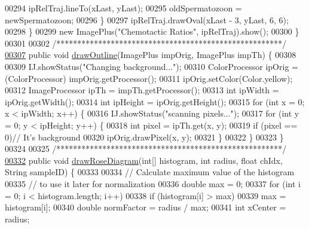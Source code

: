\begin{DoxyCode}
00294         ipRelTraj.lineTo(xLast, yLast);
00295         oldSpermatozoon = newSpermatozoon;
00296       \}
00297       ipRelTraj.drawOval(xLast - 3, yLast, 6, 6);
00298     \}
00299     \textcolor{keyword}{new} ImagePlus(\textcolor{stringliteral}{"Chemotactic Ratios"}, ipRelTraj).show();
00300   \}
00301 
00302   \textcolor{comment}{/******************************************************/}
\hypertarget{_paint_8java_source_l00307}{}\hyperlink{classfunctions_1_1_paint_a79f677db3c0f2261152a784802dab3c2}{00307}   \textcolor{keyword}{public} \textcolor{keywordtype}{void} \hyperlink{classfunctions_1_1_paint_a79f677db3c0f2261152a784802dab3c2}{drawOutline}(ImagePlus impOrig, ImagePlus impTh) \{
00308 
00309     IJ.showStatus(\textcolor{stringliteral}{"Changing background..."});
00310     ColorProcessor ipOrig = (ColorProcessor) impOrig.getProcessor();
00311     ipOrig.setColor(Color.yellow);
00312     ImageProcessor ipTh = impTh.getProcessor();
00313     \textcolor{keywordtype}{int} ipWidth = ipOrig.getWidth();
00314     \textcolor{keywordtype}{int} ipHeight = ipOrig.getHeight();
00315     \textcolor{keywordflow}{for} (\textcolor{keywordtype}{int} x = 0; x < ipWidth; x++) \{
00316       IJ.showStatus(\textcolor{stringliteral}{"scanning pixels..."});
00317       \textcolor{keywordflow}{for} (\textcolor{keywordtype}{int} y = 0; y < ipHeight; y++) \{
00318         \textcolor{keywordtype}{int} pixel = ipTh.get(x, y);
00319         \textcolor{keywordflow}{if} (pixel == 0)\textcolor{comment}{// It's background}
00320           ipOrig.drawPixel(x, y);
00321       \}
00322     \}
00323   \}
00324 
00325   \textcolor{comment}{/******************************************************/}
\hypertarget{_paint_8java_source_l00332}{}\hyperlink{classfunctions_1_1_paint_ae6e7f899e277190943b0c57232976e97}{00332}   \textcolor{keyword}{public} \textcolor{keywordtype}{void} \hyperlink{classfunctions_1_1_paint_ae6e7f899e277190943b0c57232976e97}{drawRoseDiagram}(\textcolor{keywordtype}{int}[] histogram, \textcolor{keywordtype}{int} radius, \textcolor{keywordtype}{float} chIdx, String sampleID) \{
00333 
00334     \textcolor{comment}{// Calculate maximum value of the histogram}
00335     \textcolor{comment}{// to use it later for normalization}
00336     \textcolor{keywordtype}{double} max = 0;
00337     \textcolor{keywordflow}{for} (\textcolor{keywordtype}{int} i = 0; i < histogram.length; i++)
00338       \textcolor{keywordflow}{if} (histogram[i] > max)
00339         max = histogram[i];
00340     \textcolor{keywordtype}{double} normFactor = radius / max;
00341     \textcolor{keywordtype}{int} xCenter = radius;

\end{DoxyCode}
